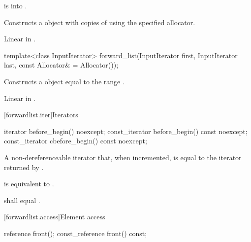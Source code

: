 \begin{itemdescr}
\pnum
\expects
{} is  into .

\pnum
\effects
Constructs a  object with  copies of  using the specified allocator.

\pnum
\complexity
Linear in .
\end{itemdescr}

%
\begin{itemdecl}
template<class InputIterator>
  forward_list(InputIterator first, InputIterator last, const Allocator& = Allocator());
\end{itemdecl}

\begin{itemdescr}
\pnum
\effects
Constructs a  object equal to the range .

\pnum
\complexity
Linear in .
\end{itemdescr}

[forwardlist.iter]{Iterators}

%
%
\begin{itemdecl}
iterator before_begin() noexcept;
const_iterator before_begin() const noexcept;
const_iterator cbefore_begin() const noexcept;
\end{itemdecl}

\begin{itemdescr}
\pnum
\returns
A non-dereferenceable iterator that, when incremented, is equal to the iterator
returned by .

\pnum
\effects
{} is equivalent to
.

\pnum
\remarks
{} shall equal .
\end{itemdescr}

[forwardlist.access]{Element access}

%
\begin{itemdecl}
reference front();
const_reference front() const;
\end{itemdecl}

\begin{itemdescr}
\pnum
\returns
{}
\end{itemdescr}

